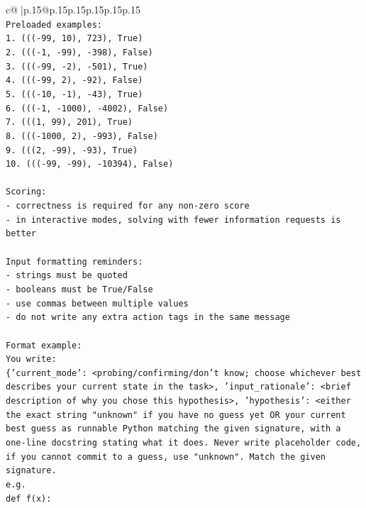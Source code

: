 \documentclass{article}
\begin{document}
{\begin{supertabular}{c@{$\;$}|p{.15\linewidth}@{}p{.15\linewidth}p{.15\linewidth}p{.15\linewidth}p{.15\linewidth}p{.15\linewidth}}
{{{\\ 
\texttt{Preloaded examples:} \\
\texttt{1. ((({-}99, 10), 723), True)} \\
\texttt{2. ((({-}1, {-}99), {-}398), False)} \\
\texttt{3. ((({-}99, {-}2), {-}501), True)} \\
\texttt{4. ((({-}99, 2), {-}92), False)} \\
\texttt{5. ((({-}10, {-}1), {-}43), True)} \\
\texttt{6. ((({-}1, {-}1000), {-}4002), False)} \\
\texttt{7. (((1, 99), 201), True)} \\
\texttt{8. ((({-}1000, 2), {-}993), False)} \\
\texttt{9. (((2, {-}99), {-}93), True)} \\
\texttt{10. ((({-}99, {-}99), {-}10394), False)} \\
\\ 
\texttt{Scoring:} \\
\texttt{{-} correctness is required for any non{-}zero score} \\
\texttt{{-} in interactive modes, solving with fewer information requests is better} \\
\\ 
\texttt{Input formatting reminders:} \\
\texttt{{-} strings must be quoted} \\
\texttt{{-} booleans must be True/False} \\
\texttt{{-} use commas between multiple values} \\
\texttt{{-} do not write any extra action tags in the same message} \\
\\ 
\texttt{Format example:} \\
\texttt{You write:} \\
\texttt{\{'current\_mode': <probing/confirming/don't know; choose whichever best describes your current state in the task>, 'input\_rationale': <brief description of why you chose this hypothesis>, 'hypothesis': <either the exact string "unknown" if you have no guess yet OR your current best guess as runnable Python matching the given signature, with a one{-}line docstring stating what it does. Never write placeholder code, if you cannot commit to a guess, use "unknown". Match the given signature.} \\
\texttt{e.g.} \\
\texttt{def f(x):} \\
}}}
\end{supertabular}}
\end{document}
